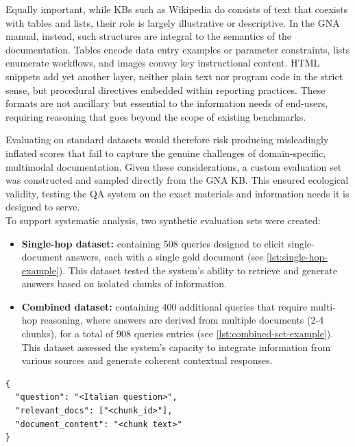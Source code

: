 \begin{spacing}{1.5}
Equally important, while KBs such as Wikipedia do consists of text that coexists with tables and lists, their role is largely illustrative or descriptive. In the GNA manual, instead, such structures are integral to the semantics of the documentation. Tables encode data entry examples or parameter constraints, lists enumerate workflows, and images convey key instructional content. HTML snippets add yet another layer, neither plain text nor program code in the strict sense, but procedural directives embedded within reporting practices. These formats are not ancillary but essential to the information needs of end-users, requiring reasoning that goes beyond the scope of existing benchmarks.

Evaluating on standard datasets would therefore risk producing misleadingly inflated scores that fail to capture the genuine challenges of domain-specific, multimodal documentation. Given these considerations, a custom evaluation set was constructed and sampled directly from the GNA KB. This ensured ecological validity, testing the QA system on the exact materials and information needs it is designed to serve.\\

\noindent To support systematic analysis, two synthetic evaluation sets were created:
\begin{itemize}
      \item \textbf{Single-hop dataset:} containing 508 queries designed to elicit single-document answers, each with a single gold document (see \autoref{lst:single-hop-example}). This dataset tested the system's ability to retrieve and generate answers based on isolated chunks of information.
      \item \textbf{Combined dataset:} containing 400 additional queries that require multi-hop reasoning, where answers are derived from multiple documents (2-4 chunks), for a total of 908 queries entries (see \autoref{lst:combined-set-example}). This dataset assessed the system's capacity to integrate information from various sources and generate coherent contextual responses.
\end{itemize}


\begin{lstlisting}[frame=none,
                   caption={JSON output format for single-hop dataset items.},
                   captionpos=b,
                   label={lst:single-hop-example},
  xleftmargin=0.2\textwidth,
  xrightmargin=0.2\textwidth,
  basicstyle=\fontsize{9}{10.5}\selectfont\ttfamily]
{
  "question": "<Italian question>",
  "relevant_docs": ["<chunk_id>"],
  "document_content": "<chunk text>"
}
\end{lstlisting}


\end{spacing}
